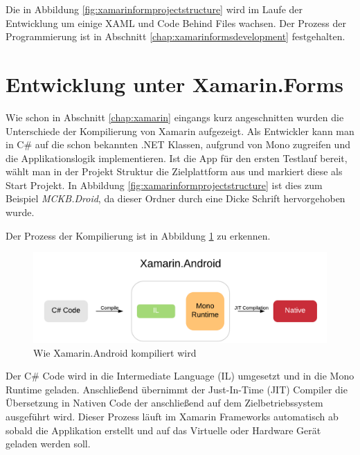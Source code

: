 	Die in Abbildung \ref{fig:xamarinformprojectstructure} wird im Laufe der Entwicklung um einige XAML und Code Behind Files wachsen. Der Prozess der Programmierung ist in Abschnitt \ref{chap:xamarinformsdevelopment} festgehalten.
	\newpage

\section{Entwicklung unter Xamarin.Forms}
\label{sec:xamarinformsdevelopement}

	Wie schon in Abschnitt \ref{chap:xamarin} eingangs kurz angeschnitten wurden die Unterschiede der Kompilierung von Xamarin aufgezeigt. Als Entwickler kann man in C\# auf die schon bekannten .NET Klassen, aufgrund von Mono zugreifen und die Applikationslogik implementieren. Ist die App für den ersten Testlauf bereit, wählt man in der Projekt Struktur die Zielplattform aus und markiert diese als Start Projekt. In Abbildung \ref{fig:xamarinformprojectstructure} ist dies zum Beispiel \textit{MCKB.Droid}, da dieser Ordner durch eine Dicke Schrift hervorgehoben wurde.

	Der Prozess der Kompilierung ist in Abbildung \ref{fig:xamarinanativeandroidcompile} zu erkennen.
	\begin{figure}[h!]
		\centering
		\includegraphics[width=1\textwidth]{images/Xamarin-Android.png}
		\caption{Wie Xamarin.Android kompiliert wird}
		\label{fig:xamarinanativeandroidcompile}
	\end{figure}

	Der C\# Code wird in die Intermediate Language (IL) umgesetzt und in die Mono Runtime geladen. Anschließend übernimmt der Just-In-Time (JIT) Compiler die Übersetzung in Nativen Code der anschließend auf dem Zielbetriebssystem ausgeführt wird. Dieser Prozess läuft im Xamarin Frameworks automatisch ab sobald die Applikation erstellt und auf das Virtuelle oder Hardware Gerät geladen werden soll.

